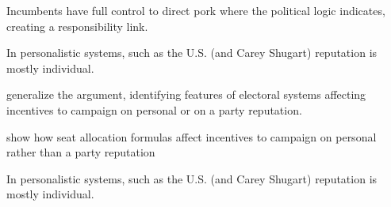 


Incumbents have full control to direct pork where the political logic indicates, creating a responsibility link.

In personalistic systems, such as the U.S. (and Carey Shugart) reputation is mostly individual.

\citet{carey.shugart.1995} generalize the argument, identifying features of electoral systems affecting incentives to campaign on personal or on a party reputation.

show how seat allocation formulas affect incentives to campaign on personal rather than a party reputation


In personalistic systems, such as the U.S. (and Carey Shugart) reputation is mostly individual.


